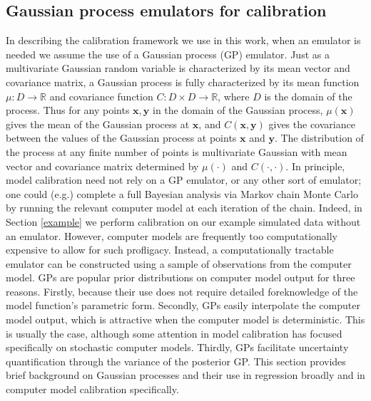 \documentclass[12pt]{article}
\begin{document}
\subsection{Gaussian process emulators for calibration}

In describing the calibration framework we use in this work, when an emulator is needed we assume the use of a Gaussian process (GP) emulator.
%
Just as a multivariate Gaussian random variable is characterized by its mean vector and covariance matrix, a Gaussian process is fully characterized by its mean function $\mu:D\to \mathbb R$ and covariance function $C:D\times D\to \mathbb R$, where $D$ is the domain of the process. 
%
Thus for any points $\mathbf x,\mathbf y$ in the domain of the Gaussian process, $\mu(\mathbf x)$ gives the mean of the Gaussian process at $\mathbf x$, and $C(\mathbf x, \mathbf y)$ gives the covariance between the values of the Gaussian process at points $\mathbf x$ and $\mathbf y$.
%
The distribution of the process at any finite number of points is multivariate Gaussian with mean vector and covariance matrix determined by $\mu(\cdot)$ and $C(\cdot,\cdot)$.
%
In principle, model calibration need not rely on a GP emulator, or any other sort of emulator; one could (e.g.) complete a full Bayesian analysis via Markov chain Monte Carlo \citep[MCMC;][]{Gelfand1990} by running the relevant computer model at each iteration of the chain. 
%
Indeed, in Section \ref{example} we perform calibration on our example simulated data without an emulator.
%
However, computer models are frequently too computationally expensive to allow for such profligacy.
%
Instead, a computationally tractable emulator can be constructed using a sample of observations from the computer model. 
%
GPs are popular prior distributions on computer model output for three reasons.
%
Firstly, because their use does not require detailed foreknowledge of the model function's parametric form. 
%
Secondly, GPs easily interpolate the computer model output, which is attractive when the computer model is deterministic. 
%
This is usually the case, although some attention in model calibration \citep[e.g.][]{Pratola2018} has focused specifically on stochastic computer models. 
%
Thirdly, GPs facilitate uncertainty quantification through the variance of the posterior GP. 
%
This section provides brief background on Gaussian processes and their use in regression broadly and in computer model calibration specifically.
%
\end{document}
